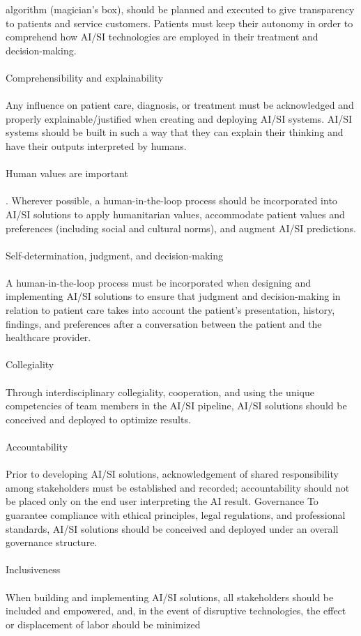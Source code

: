 \documentclass[12pt]{article}
\begin{document}
algorithm (magician's box), should be planned and executed to give transparency to patients and service
customers. Patients must keep their autonomy in order to comprehend how AI/SI technologies are employed in
their treatment and decision-making. \\\\Comprehensibility and explainability\\\\
Any influence on patient care, diagnosis, or treatment must be acknowledged and properly explainable/justified
when creating and deploying AI/SI systems. AI/SI systems should be built in such a way that they can explain
their thinking and have their outputs interpreted by humans.\\\\ Human values are important\\\\. Wherever possible, a human-in-the-loop process should be incorporated into AI/SI solutions to apply
humanitarian values, accommodate patient values and preferences (including social and cultural norms), and
augment AI/SI predictions. \\\\Self-determination, judgment, and decision-making\\\\
A human-in-the-loop process must be incorporated when designing and implementing AI/SI solutions to ensure
that judgment and decision-making in relation to patient care takes into account the patient's presentation, history, findings, and preferences after a conversation between the patient and the healthcare provider. \\\\Collegiality\\\\
Through interdisciplinary collegiality, cooperation, and using the unique competencies of team members in the
AI/SI pipeline, AI/SI solutions should be conceived and deployed to optimize results. \\\\Accountability\\\\
Prior to developing AI/SI solutions, acknowledgement of shared responsibility among stakeholders must be
established and recorded; accountability should not be placed only on the end user interpreting the AI result. Governance
To guarantee compliance with ethical principles, legal regulations, and professional standards, AI/SI solutions
should be conceived and deployed under an overall governance structure.\\\\
Inclusiveness\\\\
When building and implementing AI/SI solutions, all stakeholders should be included and empowered, and, in
the event of disruptive technologies, the effect or displacement of labor should be minimized\\ \\ 




\end{document}
